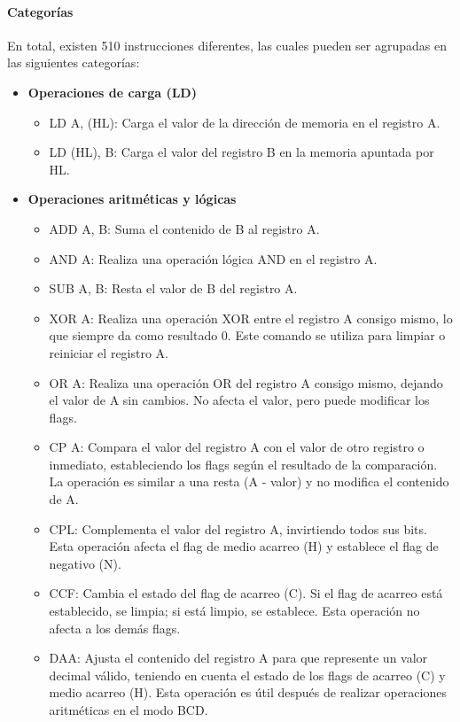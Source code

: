 \paragraph{Categorías}

En total, existen 510 instrucciones diferentes, las cuales pueden ser agrupadas en las siguientes categorías:
\begin{itemize}
  \item \textbf{Operaciones de carga (LD)}
  \begin{itemize}
  \item LD A, (HL): Carga el valor de la dirección de memoria en el registro A.
  \item LD (HL), B: Carga el valor del registro B en la memoria apuntada por HL.
  \end{itemize}
  \item \textbf{Operaciones aritméticas y lógicas}
  \begin{itemize}
  \item ADD A, B: Suma el contenido de B al registro A.
  \item AND A: Realiza una operación lógica AND en el registro A.
  \item SUB A, B: Resta el valor de B del registro A.
  \item XOR A: Realiza una operación XOR entre el registro A consigo mismo, lo que siempre da como resultado 0. Este comando se utiliza para limpiar o reiniciar el registro A.
  \item OR A: Realiza una operación OR del registro A consigo mismo, dejando el valor de A sin cambios. No afecta el valor, pero puede modificar los flags.
  \item CP A: Compara el valor del registro A con el valor de otro registro o inmediato, estableciendo los flags según el resultado de la comparación. La operación es similar a una resta (A - valor) y no modifica el contenido de A.
  \item CPL: Complementa el valor del registro A, invirtiendo todos sus bits. Esta operación afecta el flag de medio acarreo (H) y establece el flag de negativo (N).
  \item CCF: Cambia el estado del flag de acarreo (C). Si el flag de acarreo está establecido, se limpia; si está limpio, se establece. Esta operación no afecta a los demás flags.
  \item DAA: Ajusta el contenido del registro A para que represente un valor decimal válido, teniendo en cuenta el estado de los flags de acarreo (C) y medio acarreo (H). Esta operación es útil después de realizar operaciones aritméticas en el modo BCD.

\end{itemize}
\end{itemize}
